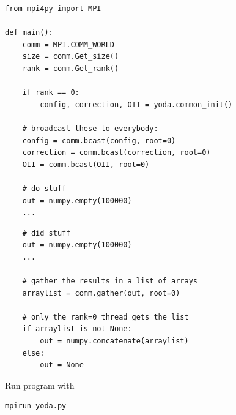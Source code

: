 \documentclass{beamer}
\begin{document}
\begin{frame}[fragile]{}
    \begin{lstlisting}
from mpi4py import MPI

def main():
    comm = MPI.COMM_WORLD
    size = comm.Get_size()
    rank = comm.Get_rank()

    if rank == 0:
        config, correction, OII = yoda.common_init()

    # broadcast these to everybody:
    config = comm.bcast(config, root=0)
    correction = comm.bcast(correction, root=0)
    OII = comm.bcast(OII, root=0)

    # do stuff
    out = numpy.empty(100000)
    ...
    \end{lstlisting}
\end{frame}
\begin{frame}[fragile]{}
    \begin{lstlisting}
    # did stuff
    out = numpy.empty(100000)
    ...

    # gather the results in a list of arrays
    arraylist = comm.gather(out, root=0)

    # only the rank=0 thread gets the list
    if arraylist is not None:
        out = numpy.concatenate(arraylist)
    else:
        out = None
    \end{lstlisting}

    \bigskip
    \vfill

    Run program with
    \begin{lstlisting}[language=sh]
    mpirun yoda.py
    \end{lstlisting}
\end{frame}


\end{document}
